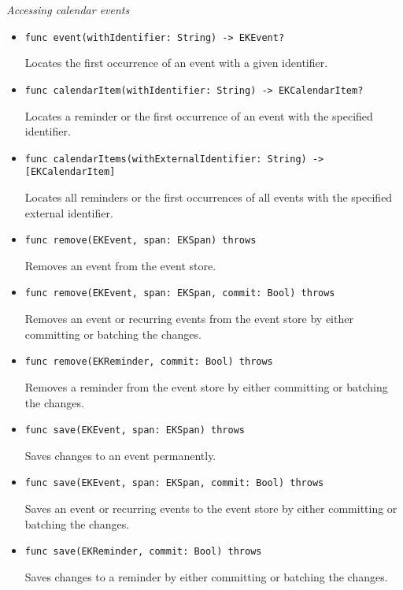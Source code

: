 \documentclass{article}
\begin{document}
\textit{Accessing calendar events}
\begin{itemize}
    \item \texttt{func event(withIdentifier: String) -> EKEvent?}

    Locates the first occurrence of an event with a given identifier.
    \item \texttt{func calendarItem(withIdentifier: String) -> EKCalendarItem?}

    Locates a reminder or the first occurrence of an event with the specified identifier.
    \item \texttt{func calendarItems(withExternalIdentifier: String) -> [EKCalendarItem]}

    Locates all reminders or the first occurrences of all events with the specified external identifier.
    \item \texttt{func remove(EKEvent, span: EKSpan) throws}

    Removes an event from the event store.
    \item \texttt{func remove(EKEvent, span: EKSpan, commit: Bool) throws}

    Removes an event or recurring events from the event store by either committing or batching the changes.
    \item \texttt{func remove(EKReminder, commit: Bool) throws}

    Removes a reminder from the event store by either committing or batching the changes.
    \item \texttt{func save(EKEvent, span: EKSpan) throws}

    Saves changes to an event permanently.
    \item \texttt{func save(EKEvent, span: EKSpan, commit: Bool) throws}

    Saves an event or recurring events to the event store by either committing or batching the changes.
    \item \texttt{func save(EKReminder, commit: Bool) throws}

    Saves changes to a reminder by either committing or batching the changes.
\end{itemize}
\end{document}
